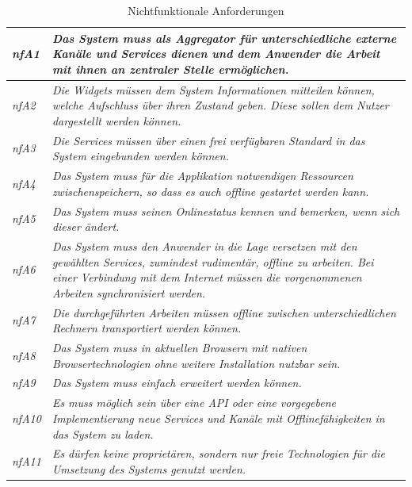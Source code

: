 \begin{table}[ht]
\caption{Nichtfunktionale Anforderungen}
\begin{tabularx}{\textwidth}{ l | X }
\emph{nfA1} & \emph{Das System muss als Aggregator für unterschiedliche externe Kanäle und Services dienen und dem Anwender die Arbeit mit ihnen an zentraler Stelle ermöglichen.} \\ \hline
\emph{nfA2} & \emph{Die Widgets müssen dem System Informationen mitteilen können, welche Aufschluss über ihren Zustand geben. Diese sollen dem Nutzer dargestellt werden können.} \\ \hline
\emph{nfA3} & \emph{Die Services müssen über einen frei verfügbaren Standard in das System eingebunden werden können.} \\ \hline
\emph{nfA4} & \emph{Das System muss für die Applikation notwendigen Ressourcen zwischenspeichern, so dass es auch offline gestartet werden kann.} \\ \hline
\emph{nfA5} & \emph{Das System muss seinen Onlinestatus kennen und bemerken, wenn sich dieser ändert.} \\ \hline
\emph{nfA6} & \emph{Das System muss den Anwender in die Lage versetzen mit den gewählten Services, zumindest rudimentär, offline zu arbeiten. Bei einer Verbindung mit dem Internet müssen die vorgenommenen Arbeiten synchronisiert werden.} \\ \hline
\emph{nfA7} & \emph{Die durchgeführten Arbeiten müssen offline zwischen unterschiedlichen Rechnern transportiert werden können.} \\ \hline
\emph{nfA8} & \emph{Das System muss in aktuellen Browsern mit nativen Browsertechnologien ohne weitere Installation nutzbar sein.} \\ \hline
\emph{nfA9} & \emph{Das System muss einfach erweitert werden können.} \\ \hline
\emph{nfA10} & \emph{Es muss möglich sein über eine API oder eine vorgegebene Implementierung neue Services und Kanäle mit Offlinefähigkeiten in das System zu laden.} \\ \hline
\emph{nfA11} & \emph{Es dürfen keine proprietären, sondern nur freie Technologien für die Umsetzung des Systems genutzt werden.} \\ \hline
\end{tabularx}
\label{table:nichtfunktionale_anforderungen}
\end{table}
